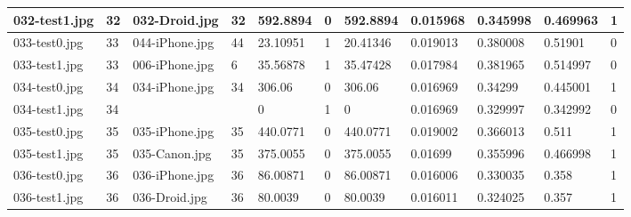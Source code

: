 \begin{landscape}
\begin{longtable}{|p{2cm}|p{1cm}|p{2cm}|p{1cm}|p{2cm}|p{1cm}|p{2cm}|p{2cm}|p{2cm}|p{2cm}|p{1cm}|}
	032-test1.jpg   & 32               & 032-Droid.jpg         & 32                          & 592.8894              & 0                       & 592.8894                   & 0.015968              & 0.345998              & 0.469963                 & 1                \\ \hline
	033-test0.jpg   & 33               & 044-iPhone.jpg        & 44                          & 23.10951              & 1                       & 20.41346                   & 0.019013              & 0.380008              & 0.51901                  & 0                \\ \hline
	033-test1.jpg   & 33               & 006-iPhone.jpg        & 6                           & 35.56878              & 1                       & 35.47428                   & 0.017984              & 0.381965              & 0.514997                 & 0                \\ \hline
	034-test0.jpg   & 34               & 034-iPhone.jpg        & 34                          & 306.06                & 0                       & 306.06                     & 0.016969              & 0.34299               & 0.445001                 & 1                \\ \hline
	034-test1.jpg   & 34               &                       &                             & 0                     & 1                       & 0                          & 0.016969              & 0.329997              & 0.342992                 & 0                \\ \hline
	035-test0.jpg   & 35               & 035-iPhone.jpg        & 35                          & 440.0771              & 0                       & 440.0771                   & 0.019002              & 0.366013              & 0.511                    & 1                \\ \hline
	035-test1.jpg   & 35               & 035-Canon.jpg         & 35                          & 375.0055              & 0                       & 375.0055                   & 0.01699               & 0.355996              & 0.466998                 & 1                \\ \hline
	036-test0.jpg   & 36               & 036-iPhone.jpg        & 36                          & 86.00871              & 0                       & 86.00871                   & 0.016006              & 0.330035              & 0.358                    & 1                \\ \hline
	036-test1.jpg   & 36               & 036-Droid.jpg         & 36                          & 80.0039               & 0                       & 80.0039                    & 0.016011              & 0.324025              & 0.357                    & 1                \\ \hline

\end{longtable}
\end{landscape}
